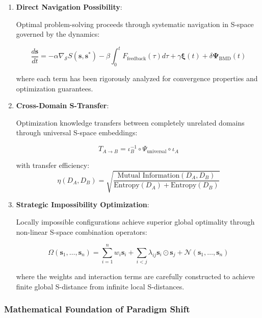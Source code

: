 \documentclass[11pt]{article}
\theoremstyle{definition}
\theoremstyle{remark}
\newcommand{\SEntropy}{\mathcal{S}}
\begin{document}
\begin{enumerate}
\item \textbf{Direct Navigation Possibility}: 

Optimal problem-solving proceeds through systematic navigation in S-space governed by the dynamics:

\begin{equation}
\frac{d\mathbf{s}}{dt} = -\alpha \nabla_{\SEntropy} S(\mathbf{s}, \mathbf{s}^*) - \beta \int_0^t F_{\text{feedback}}(\tau) d\tau + \gamma \boldsymbol{\xi}(t) + \delta \boldsymbol{\Psi}_{\text{BMD}}(t)
\end{equation}

where each term has been rigorously analyzed for convergence properties and optimization guarantees.

\item \textbf{Cross-Domain S-Transfer}: 

Optimization knowledge transfers between completely unrelated domains through universal S-space embeddings:

\begin{equation}
T_{A \to B} = \iota_B^{-1} \circ \Psi_{\text{universal}} \circ \iota_A
\end{equation}

with transfer efficiency:
\begin{equation}
\eta(D_A, D_B) = \sqrt{\frac{\text{Mutual Information}(D_A, D_B)}{\text{Entropy}(D_A) + \text{Entropy}(D_B)}}
\end{equation}

\item \textbf{Strategic Impossibility Optimization}: 

Locally impossible configurations achieve superior global optimality through non-linear S-space combination operators:

\begin{equation}
\Omega(\mathbf{s}_1, \ldots, \mathbf{s}_n) = \sum_{i=1}^n w_i \mathbf{s}_i + \sum_{i<j} \lambda_{ij} \mathbf{s}_i \odot \mathbf{s}_j + \mathcal{N}(\mathbf{s}_1, \ldots, \mathbf{s}_n)
\end{equation}

where the weights and interaction terms are carefully constructed to achieve finite global S-distance from infinite local S-distances.
\end{enumerate}

\subsubsection{Mathematical Foundation of Paradigm Shift}
\end{document}
